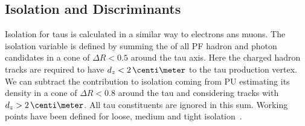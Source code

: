 % 
% 

\subsection{Isolation and Discriminants}
\label{SECTION:EventReconstructionAndSimulation_Taus_IsolationAndDiscriminants}


Isolation for taus is calculated in a similar way to electrons ans muons. The isolation variable is defined by summing the \pt of all \gls{PF} hadron and photon candidates in a cone of $\Delta R < 0.5$ around the tau axis. Here the charged hadron tracks are required to have $d_z < 2\,\centi\meter$ to the tau production vertex. We can subtract the contribution to isolation coming from \gls{PU} estimating its density in a cone of $\Delta R < 0.8$ around the tau and considering tracks with $d_z > 2\,\centi\meter$. All tau constituents are ignored in this sum. Working points have been defined for loose, medium and tight isolation~\cite{ARTICLE:CMSReconstructionIndentificationTau}.


